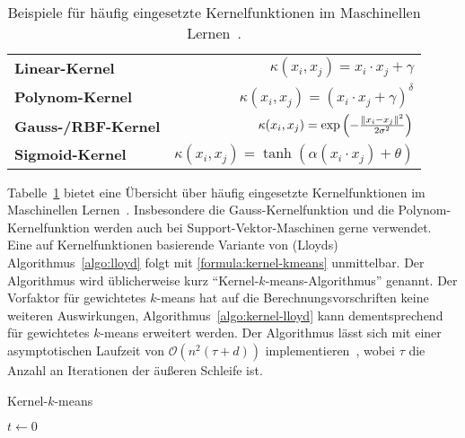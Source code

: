\begin{table}[t]
\centering
\begin{tabular}{@{}lr@{}} \toprule
	\textbf{Linear-Kernel} & $\kappa(x_i, x_j) = x_i \cdot x_j + \gamma $ \\
	\textbf{Polynom-Kernel} & $\kappa(x_i, x_j) = \left( x_i \cdot x_j + \gamma \right)^\delta$ \\
	\textbf{Gauss-/RBF-Kernel} & $\kappa(x_i, x_j) = \exp \left( - \frac{\lVert {x_i} - {x_j} \rVert^2}{2 \sigma^2} \right)$ \\
	\textbf{Sigmoid-Kernel} & $\kappa(x_i, x_j) = \tanh(\alpha(x_i \cdot x_j) + \theta) $ \\ \bottomrule
\end{tabular}
\caption{Beispiele für häufig eingesetzte Kernelfunktionen im Maschinellen Lernen~\cite{HofmannSS08}.}
\label{tbl:kernel-functions}
\end{table}
Tabelle~\ref{tbl:kernel-functions} bietet eine Übersicht über häufig eingesetzte Kernelfunktionen im Maschinellen
Lernen~\cite{HofmannSS08}. Insbesondere
die Gauss-Kernelfunktion und die Polynom-Kernelfunktion werden auch bei Support-Vektor-Maschinen gerne verwendet.
\absatz
Eine auf Kernelfunktionen basierende Variante von (Lloyds) Algorithmus~\ref{algo:lloyd} folgt mit \ref{formula:kernel-kmeans}
unmittelbar. Der Algorithmus wird üblicherweise kurz "`Kernel-$k$-means-Algorithmus"' genannt.
Der Vorfaktor für gewichtetes $k$-means hat auf die Berechnungsvorschriften keine weiteren Auswirkungen,
Algorithmus~\ref{algo:kernel-lloyd} kann dementsprechend für gewichtetes $k$-means erweitert werden. Der Algorithmus
lässt sich mit einer asymptotischen Laufzeit von $\mathcal{O}(n^2 (\tau + d))$ implementieren~\cite{DhillonGK04,DhillonGK07},
wobei $\tau$ die Anzahl an Iterationen der äußeren Schleife ist.
\begin{algorithm}[t]
\caption{Kernel-$k$-means}
\label{algo:kernel-lloyd}
	\DontPrintSemicolon
	
	\BlankLine
	
	$t \leftarrow 0$\;
\end{algorithm}

